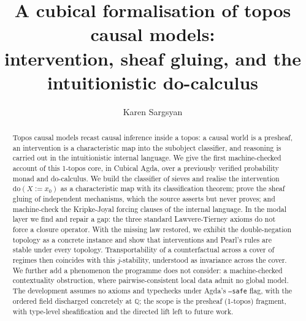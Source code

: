 \documentclass{lmcs}
\newcommand{\dom}[2]{\mathrm{do}(#1\!:=\!#2)}
\begin{document}
\title[A cubical formalisation of topos causal models]{A cubical formalisation of topos causal models: \\ intervention, sheaf gluing, and the intuitionistic do-calculus}

\author[K.~Sargsyan]{Karen Sargsyan}
\address{Institute of Chemistry, Academia Sinica, Taipei, Taiwan}


\begin{abstract}
Topos causal models recast causal inference inside a topos: a causal world is a presheaf, an intervention is a characteristic map into the subobject classifier, and reasoning is carried out in the intuitionistic internal language. We give the first machine-checked account of this 1-topos core, in Cubical Agda, over a previously verified probability monad and do-calculus. We build the classifier of sieves and realise the intervention $\dom{X}{x_0}$ as a characteristic map with its classification theorem; prove the sheaf gluing of independent mechanisms, which the source asserts but never proves; and machine-check the Kripke-Joyal forcing clauses of the internal language. In the modal layer we find and repair a gap: the three standard Lawvere-Tierney axioms do not force a closure operator. With the missing law restored, we exhibit the double-negation topology as a concrete instance and show that interventions and Pearl's rules are stable under every topology. Transportability of a counterfactual across a cover of regimes then coincides with this $j$-stability, understood as invariance across the cover. We further add a phenomenon the programme does not consider: a machine-checked contextuality obstruction, where pairwise-consistent local data admit no global model. The development assumes no axioms and typechecks under Agda's \texttt{--safe} flag, with the ordered field discharged concretely at $\mathbb{Q}$; the scope is the presheaf (1-topos) fragment, with type-level sheafification and the directed lift left to future work.
\end{abstract}
\end{document}
